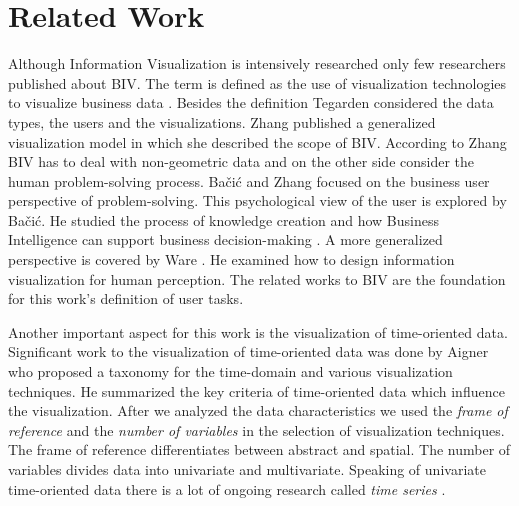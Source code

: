 \section{Related Work}
Although Information Visualization is intensively researched  \cite{Shneiderman2008,  Shneiderman2002,  Shneiderman1996,  Keim2002} only few researchers published about BIV. The term is defined as the use of visualization technologies to visualize business data  \cite{Tegarden1999}.  Besides the definition Tegarden considered the data types,  the users and the visualizations. Zhang  \cite{Zhang1995,  Zhang1998,  Zhang2001} published a generalized visualization model in which she described the scope of BIV. According to Zhang BIV has to deal with non-geometric data and on the other side consider the human problem-solving process. Bačić and Zhang focused on the business user perspective of problem-solving. This psychological view of the user is explored by Bačić. He studied the process of knowledge creation  \cite{Bacic2012} and how Business Intelligence can support business decision-making  \cite{Bacic2013,  Bacic2012}. A more generalized perspective is covered by Ware \cite{Ware2012a}. He examined how to design information visualization for human perception. The related works to BIV are the foundation for this work's definition of user tasks. 
\par
Another important aspect for this work is the visualization of time-oriented data. 
Significant work to the visualization of time-oriented data was done by Aigner \cite{Aigner2011,  Aigner2008,  Aigner2007} who proposed a taxonomy for the time-domain and various visualization techniques. He summarized the key criteria of time-oriented data which influence the visualization. After we analyzed the data characteristics we used the \textit{frame of reference} and the \textit{number of variables} in the selection of visualization techniques. The frame of reference differentiates between abstract and spatial. The number of variables divides data into univariate and multivariate. Speaking of univariate time-oriented data there is a lot of ongoing research called \textit{time series}  \cite{Aigner2011,  Buono2005,  Walker2016,  Leonard2005,  Chen1993,  Esling2012}. 

